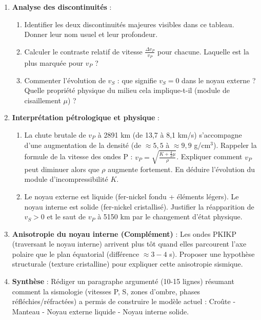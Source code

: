 \documentclass[11pt]{article}
\begin{document}
\begin{exercice}
\begin{enumerate}
    \item \textbf{Analyse des discontinuités} :
    \begin{enumerate}
        \item Identifier les deux discontinuités majeures visibles dans ce tableau. Donner leur nom usuel et leur profondeur.
        \item Calculer le contraste relatif de vitesse $\frac{\Delta v_P}{v_P}$ pour chacune. Laquelle est la plus marquée pour $v_P$ ?
        \item Commenter l'évolution de $v_S$ : que signifie $v_S = 0$ dans le noyau externe ? Quelle propriété physique du milieu cela implique-t-il (module de cisaillement $\mu$) ?
    \end{enumerate}
    \item \textbf{Interprétation pétrologique et physique} :
    \begin{enumerate}
        \item La chute brutale de $v_P$ à 2891 km (de 13,7 à 8,1 km/s) s'accompagne d'une augmentation de la densité (de $\approx 5,5$ à $\approx 9,9$ g/cm$^3$). Rappeler la formule de la vitesse des ondes P : $v_P = \sqrt{\frac{K + \frac{4}{3}\mu}{\rho}}$. Expliquer comment $v_P$ peut diminuer alors que $\rho$ augmente fortement. En déduire l'évolution du module d'incompressibilité $K$.
        \item Le noyau externe est liquide (fer-nickel fondu + éléments légers). Le noyau interne est solide (fer-nickel cristallisé). Justifier la réapparition de $v_S > 0$ et le saut de $v_P$ à 5150 km par le changement d'état physique.
    \end{enumerate}
    \item \textbf{Anisotropie du noyau interne (Complément)} : Les ondes PKIKP (traversant le noyau interne) arrivent plus tôt quand elles parcourent l'axe polaire que le plan équatorial (différence $\approx 3-4$ s). Proposer une hypothèse structurale (texture cristalline) pour expliquer cette anisotropie sismique.
    \item \textbf{Synthèse} : Rédiger un paragraphe argumenté (10-15 lignes) résumant comment la sismologie (vitesses P, S, zones d'ombre, phases réfléchies/réfractées) a permis de construire le modèle actuel : Croûte - Manteau - Noyau externe liquide - Noyau interne solide.
\end{enumerate}
\end{exercice}
\end{document}
